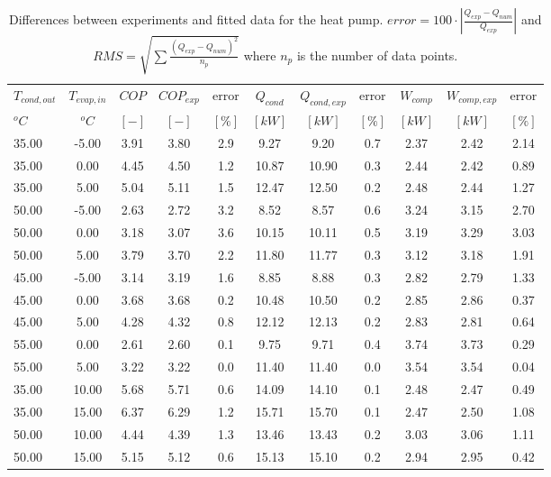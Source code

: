\documentclass[english]{SPFShortReport}
\begin{document}
\begin{table}[!ht]
\begin{small}
\caption{Differences between experiments and fitted data for the heat pump.          $error=100 \cdot |\frac{Q_{exp}-Q_{num}}{Q_{exp}}|$ and $RMS = \sqrt { \sum{\frac{(Q_{exp}-Q_{num})^2}{n_p}} }$ where $n_p$ is the number of data points.}
\begin{center}
\resizebox{12cm}{!} 
{
\begin{tabular}{l | c c c c c c c c c c } 
\hline
\hline
$T_{cond,out}$ &$T_{evap,in}$ &$COP$ &$COP_{exp}$ &error &$Q_{cond}$ &$Q_{cond,exp}$ &error &$W_{comp}$ &$W_{comp,exp}$ &error \\ 
$^oC$ &$^oC$ &$[-]$ &$[-]$ &$[\%]$ &$[kW]$ &$[kW]$ &$[\%]$ &$[kW]$ &$[kW]$ &$[\%]$\\ 
\hline
35.00  & -5.00 & 3.91 & 3.80 & 2.9 & 9.27 & 9.20 & 0.7 & 2.37 & 2.42 & 2.14\\ 
35.00  & 0.00 & 4.45 & 4.50 & 1.2 & 10.87 & 10.90 & 0.3 & 2.44 & 2.42 & 0.89\\ 
35.00  & 5.00 & 5.04 & 5.11 & 1.5 & 12.47 & 12.50 & 0.2 & 2.48 & 2.44 & 1.27\\ 
50.00  & -5.00 & 2.63 & 2.72 & 3.2 & 8.52 & 8.57 & 0.6 & 3.24 & 3.15 & 2.70\\ 
50.00  & 0.00 & 3.18 & 3.07 & 3.6 & 10.15 & 10.11 & 0.5 & 3.19 & 3.29 & 3.03\\ 
50.00  & 5.00 & 3.79 & 3.70 & 2.2 & 11.80 & 11.77 & 0.3 & 3.12 & 3.18 & 1.91\\ 
45.00  & -5.00 & 3.14 & 3.19 & 1.6 & 8.85 & 8.88 & 0.3 & 2.82 & 2.79 & 1.33\\ 
45.00  & 0.00 & 3.68 & 3.68 & 0.2 & 10.48 & 10.50 & 0.2 & 2.85 & 2.86 & 0.37\\ 
45.00  & 5.00 & 4.28 & 4.32 & 0.8 & 12.12 & 12.13 & 0.2 & 2.83 & 2.81 & 0.64\\ 
55.00  & 0.00 & 2.61 & 2.60 & 0.1 & 9.75 & 9.71 & 0.4 & 3.74 & 3.73 & 0.29\\ 
55.00  & 5.00 & 3.22 & 3.22 & 0.0 & 11.40 & 11.40 & 0.0 & 3.54 & 3.54 & 0.04\\ 
35.00  & 10.00 & 5.68 & 5.71 & 0.6 & 14.09 & 14.10 & 0.1 & 2.48 & 2.47 & 0.49\\ 
35.00  & 15.00 & 6.37 & 6.29 & 1.2 & 15.71 & 15.70 & 0.1 & 2.47 & 2.50 & 1.08\\ 
50.00  & 10.00 & 4.44 & 4.39 & 1.3 & 13.46 & 13.43 & 0.2 & 3.03 & 3.06 & 1.11\\ 
50.00  & 15.00 & 5.15 & 5.12 & 0.6 & 15.13 & 15.10 & 0.2 & 2.94 & 2.95 & 0.42\\ 

\end{tabular}}
\end{center}
\end{small}
\end{table}
\end{document}
